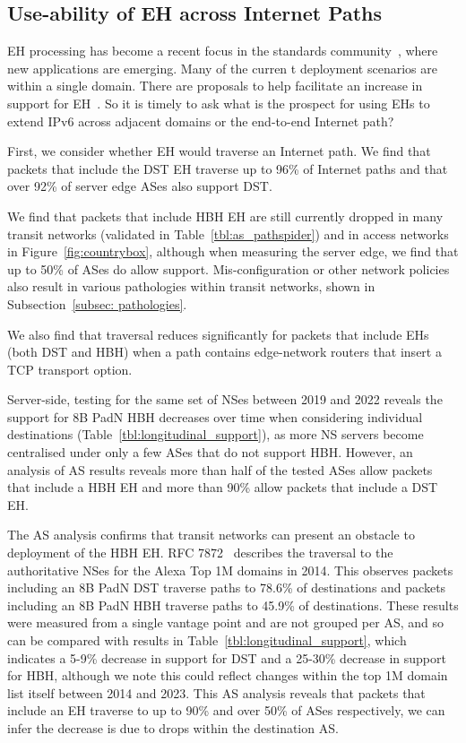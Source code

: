 \documentclass[conference]{IEEEtran}
\begin{document}
\subsection{Use-ability of EH across Internet Paths}

 EH processing has become a recent focus in the standards community~\cite {ietf-v6ops-HBH-03},
 where new applications are emerging. Many of the curren t deployment scenarios are within a single domain. There are proposals to help facilitate an increase in support for EH~\cite{ietf-6man-HBH-processing-06, ietf-6man-eh-limits-02}. 
 So it is timely to ask what is the prospect for using EHs to extend IPv6 across adjacent domains or the end-to-end Internet path?

First, we consider whether EH would traverse an Internet path.
We find that packets that include the DST EH traverse up to 96\% of Internet paths and that over 92\% of server edge ASes also support DST.


We find that packets that include HBH EH are still currently dropped in many transit networks (validated in Table~\ref{tbl:as_pathspider}) and in access networks in Figure~\ref{fig:countrybox}, although when measuring the server edge, we find that up to 50\% of ASes do allow support. Mis-configuration or other network policies also result in various pathologies within transit networks, shown in Subsection~\ref{subsec: pathologies}. 

We also find that traversal reduces significantly for packets that include EHs (both DST and HBH) when a path contains edge-network routers that insert a TCP transport option.

Server-side, testing for the same set of NSes between 2019 and 2022 reveals the support for 8B PadN HBH decreases over time when considering individual destinations (Table~\ref{tbl:longitudinal_support}), as more NS servers become centralised under only a few ASes that do not support HBH.  However, an analysis of AS results reveals more than half of the tested ASes allow packets that include a HBH EH and more than 90\% allow packets that include a DST EH. 

The AS analysis confirms that transit networks can present an obstacle to deployment of the HBH EH.
RFC 7872~\cite{RFC7872} describes the traversal to the authoritative NSes for the Alexa Top 1M domains in 2014. This observes packets including an 8B PadN DST traverse paths to  78.6\% of destinations and packets including an 8B PadN HBH traverse paths to 45.9\% of destinations. These results were measured from a single vantage point and are not grouped per AS, and so can be compared with results in Table~\ref{tbl:longitudinal_support}, which indicates a 5-9\% decrease in support for DST and a 25-30\% decrease in support for HBH, although we note this could reflect changes within the top 1M domain list itself between 2014 and 2023.
This AS analysis reveals that packets that include an EH traverse to up to 90\% and over 50\% of ASes respectively, we can infer the decrease is due to drops within the destination AS.
\end{document}

